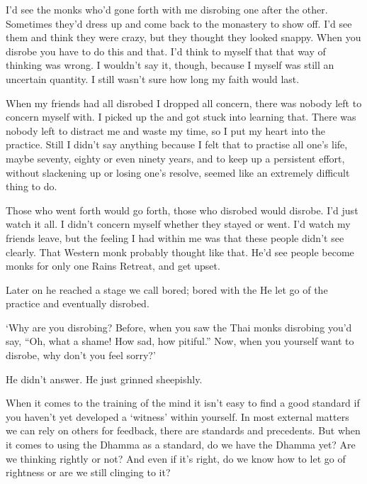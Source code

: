 I'd see the monks who'd gone forth with me disrobing one after the other. Sometimes they'd dress up and come back to the monastery to show off. I'd see them and think they were crazy, but they thought they looked snappy. When you disrobe you have to do this and that. I'd think to myself that that way of thinking was wrong. I wouldn't say it, though, because I myself was still an uncertain quantity. I still wasn't sure how long my faith would last. 

When my friends had all disrobed I dropped all concern, there was nobody left to concern myself with. I picked up the  and got stuck into learning that. There was nobody left to distract me and waste my time, so I put my heart into the practice. Still I didn't say anything because I felt that to practise all one's life, maybe seventy, eighty or even ninety years, and to keep up a persistent effort, without slackening up or losing one's resolve, seemed like an extremely difficult thing to do. 

Those who went forth would go forth, those who disrobed would disrobe. I'd just watch it all. I didn't concern myself whether they stayed or went. I'd watch my friends leave, but the feeling I had within me was that these people didn't see clearly. That Western monk probably thought like that. He'd see people become monks for only one Rains Retreat, and get upset. 

Later on he reached a stage we call bored; bored with the  He let go of the practice and eventually disrobed. 

`Why are you disrobing? Before, when you saw the Thai monks disrobing you'd say, ``Oh, what a shame! How sad, how pitiful.'' Now, when you yourself want to disrobe, why don't you feel sorry?' 

He didn't answer. He just grinned sheepishly. 

When it comes to the training of the mind it isn't easy to find a good standard if you haven't yet developed a `witness' within yourself. In most external matters we can rely on others for feedback, there are standards and precedents. But when it comes to using the Dhamma as a standard, do we have the Dhamma yet? Are we thinking rightly or not? And even if it's right, do we know how to let go of rightness or are we still clinging to it? 

